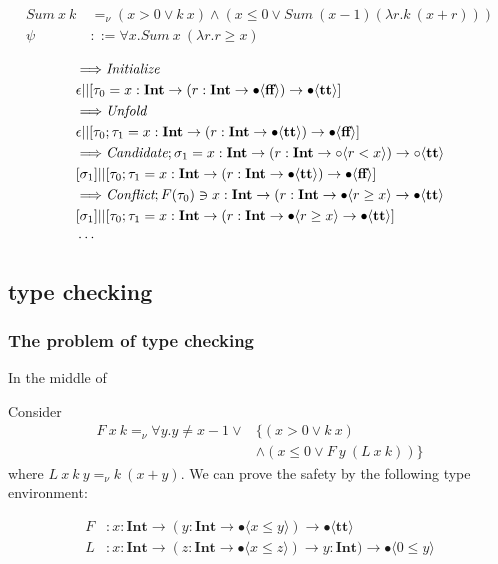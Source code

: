 \documentclass[runningheads]{llncs}
\newcommand \true {\textbf{tt}}
\newcommand \false {\textbf{ff}}
\newcommand \stypeint {\textbf{Int}}
\newcommand \stypebool {\bullet}
\newcommand \stypeboolf {\circ}
\newcommand \typeint[1]{{#1} : \stypeint}
\newcommand \typebool[1]{\stypebool \langle #1 \rangle}
\newcommand \typeboolf[1]{\stypeboolf \langle #1 \rangle}
\newcommand {\rconflict} {\emph{Conflict}}
\newcommand {\rcandidate} {\emph{Candidate}}
\newcommand {\runfold} {\emph{Unfold}}
\newcommand {\rinitialize} {\emph{Initialize}}
\begin{document}
\begin{align*}
    Sum\ x\ k\ &=_\nu (x > 0 \lor k\ x) \land
                    (x \leq 0 \lor Sum\ (x - 1) (\lambda r. k\ (x + r)))\\
    \psi &::= \forall x. Sum\ x\ (\lambda r. r \geq x)
\end{align*}

\begin{align*}
    &\Longrightarrow \rinitialize{} \\
    &\epsilon ||
    [\tau_0 = \typeint{x} \to (\typeint{r} \to \typebool{\false}) \to \typebool{\true}]\\
    &\Longrightarrow \runfold{} \\
    &\epsilon ||
    [\tau_0; \tau_1 = \typeint{x} \to (\typeint{r} \to \typebool{\true}) \to \typebool{\false}]\\
    &\Longrightarrow \rcandidate{}
    ; \sigma_1 = \typeint{x} \to (\typeint{r} \to \typeboolf{r < x}) \to \typeboolf{\true}  \\
    &
    [\sigma_1] ||
    [\tau_0; \tau_1 = \typeint{x} \to (\typeint{r} \to \typebool{\true}) \to \typebool{\false}]\\
    &\Longrightarrow \rconflict{};  F(\tau_0) \ni \typeint{x} \to (\typeint{r} \to \typebool{r \geq x} \to \typebool{\true}\\
    &
    [\sigma_1] ||
    [\tau_0; \tau_1 = \typeint{x} \to (\typeint{r} \to \typebool{r \geq x} \to \typebool{\true}]\\
    &\cdots
\end{align*}

\subsection{type checking}
\subsubsection{The problem of type checking}

In the middle of

Consider
\begin{align*}
    F\ x\ k =_\nu \forall y. y \neq x - 1 \lor
        & \{ (x > 0 \lor k\ x)\\
        & \land ( x \leq 0 \lor F\ y\ (L\ x\ k)) \}
\end{align*}
where \( L\ x\ k\ y =_\nu k\ (x + y) \).
We can prove the safety by the following type environment:

\begin{align*}
    F&: \typeint{x} \to (\typeint{y} \to \typebool{x \leq y}) \to
    \typebool{\true}\\
    L&: \typeint{x} \to (\typeint{z} \to \typebool{x \leq z}) \to
    \typeint{y}) \to \typebool{0 \leq y}
\end{align*}
\end{document}
